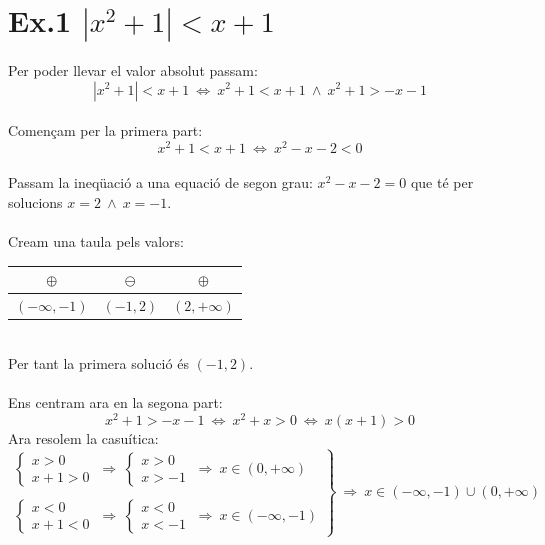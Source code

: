 
\section*{Ex.1 $|x^2+1|<x+1$}
Per poder llevar el valor absolut passam:
\begin{equation*}
|x^2+1|<x+1 \ \Longleftrightarrow \ x^2+1<x+1 \ \wedge \ x^2+1>-x-1
\end{equation*}
\\
Començam per la primera part:
\\
\begin{equation*}
x^2+1<x+1 \ \Leftrightarrow \ x^2-x-2<0 
\end{equation*}
\\
Passam la ineqüació a una equació de segon grau: $x^2-x-2=0$ que té per solucions $x=2 \ \wedge \ x=-1$. \\
\\
Cream una taula pels valors:
\begin{table}[h!]
\begin{center}
\begin{tabular}{c|c|c}
$\oplus$ & $\ominus$ & $\oplus$\\
\hline
$(-\infty,-1)$ & $(-1,2)$ & $(2,+\infty)$
\end{tabular}
\end{center}
\end{table}
\\
Per tant la primera solució és $(-1,2)$.
\\
\\
Ens centram ara en la segona part:
\begin{equation*}
x^2+1>-x-1 \ \Leftrightarrow \ x^2+x>0 \ \Leftrightarrow \ x(x+1)>0
\end{equation*}
Ara resolem la casuítica:
\begin{equation*}
\left.
\begin{array}{cc}
\left\lbrace
\begin{array}{cc}
x>0\\
x+1>0
\end{array}\right.
\ \Longrightarrow \
\left\lbrace
\begin{array}{cc}
x>0\\
x>-1
\end{array}\right.
\ \Longrightarrow \
x\in (0,+\infty)
\\
\\
\left\lbrace
\begin{array}{cc}
x<0\\
x+1<0
\end{array}\right.
\ \Longrightarrow \
\left\lbrace
\begin{array}{cc}
x<0\\
x<-1
\end{array}\right.
\ \Longrightarrow \
x\in(-\infty,-1)
\end{array}\right\rbrace
\ \Longrightarrow \
x\in(-\infty,-1)\cup(0,+\infty)
\end{equation*}
